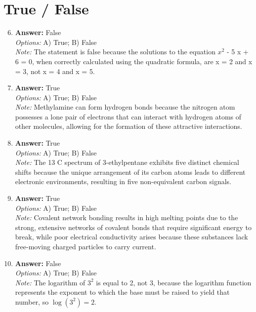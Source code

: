 \documentclass[12pt]{article}
\begin{document}
\section*{True / False}
\begin{enumerate}[label=\arabic*.]
\setcounter{enumi}{5}
\item \textbf{Answer:} False
\\ \textit{Options:} A) True; B) False
\\ \textit{Note:} The statement is false because the solutions to the equation $x^2$ - 5 x + 6 = 0, when correctly calculated using the quadratic formula, are x = 2 and x = 3, not x = 4 and x = 5.
\item \textbf{Answer:} True
\\ \textit{Options:} A) True; B) False
\\ \textit{Note:} Methylamine can form hydrogen bonds because the nitrogen atom possesses a lone pair of electrons that can interact with hydrogen atoms of other molecules, allowing for the formation of these attractive interactions.
\item \textbf{Answer:} True
\\ \textit{Options:} A) True; B) False
\\ \textit{Note:} The 13 C spectrum of 3-ethylpentane exhibits five distinct chemical shifts because the unique arrangement of its carbon atoms leads to different electronic environments, resulting in five non-equivalent carbon signals.
\item \textbf{Answer:} True
\\ \textit{Options:} A) True; B) False
\\ \textit{Note:} Covalent network bonding results in high melting points due to the strong, extensive networks of covalent bonds that require significant energy to break, while poor electrical conductivity arises because these substances lack free-moving charged particles to carry current.
\item \textbf{Answer:} False
\\ \textit{Options:} A) True; B) False
\\ \textit{Note:} The logarithm of \(3^2\) is equal to 2, not 3, because the logarithm function represents the exponent to which the base must be raised to yield that number, so \(\log(3^2) = 2\).
\end{enumerate}
\end{document}
